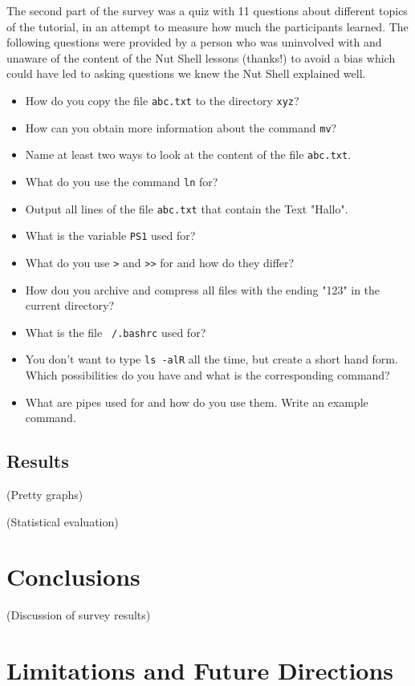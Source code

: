 \documentclass[twoside,parskip]{scrreprt}
\begin{document}
The second part of the survey was a quiz with 11 questions about different topics of the tutorial, in an attempt to measure how much the participants learned. The following questions were provided by a person who was uninvolved with and unaware of the content of the Nut Shell lessons (thanks!) to avoid a bias which could have led to asking questions we knew the Nut Shell explained well.

\begin{itemize}
    \item How do you copy the file \texttt{abc.txt} to the directory \texttt{xyz}?
    \item How can you obtain more information about the command \texttt{mv}?
    \item Name at least two ways to look at the content of the file \texttt{abc.txt}.
    \item What do you use the command \texttt{ln} for?
    \item Output all lines of the file \texttt{abc.txt} that contain the Text "Hallo".
    \item What is the variable \texttt{PS1} used for?
    \item What do you use \texttt{>} and \texttt{>>} for and how do they differ?
    \item How dou you archive and compress all files with the ending "123" in the current directory?
    \item What is the file \texttt{~/.bashrc} used for?
    \item You don't want to type \texttt{ls -alR} all the time, but create a short hand form. Which possibilities do you have and what is the corresponding command?
    \item What are pipes used for and how do you use them. Write an example command.
\end{itemize}

\section{Results}

(Pretty graphs)

(Statistical evaluation)

\chapter{Conclusions}

(Discussion of survey results)

\chapter{Limitations and Future Directions}
\end{document}
